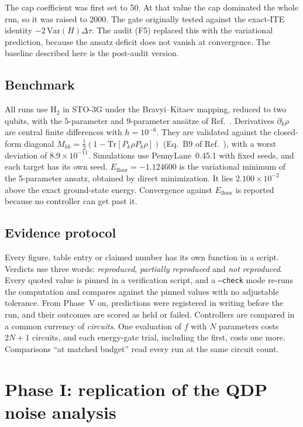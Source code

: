 \documentclass[aps,pra,reprint,superscriptaddress,nofootinbib]{revtex4-2}
\newcommand{\dt}{\Delta\tau}
\newcommand{\Tr}{\mathrm{Tr}}
\newcommand{\Efloor}{E_{\mathrm{floor}}}
\newcommand{\verdict}[1]{\textsl{#1}}
\begin{document}
The cap coefficient was first set to 50. At that value the cap dominated the whole run, so it
was raised to 2000. The gate originally tested against the exact-ITE identity
$-2\,\mathrm{Var}(H)\dt$. The audit (F5) replaced this with the variational prediction,
because the ansatz deficit does not vanish at convergence. The baseline described here is the post-audit version.

\subsection{Benchmark}

All runs use H$_2$ in STO-3G under the Bravyi--Kitaev mapping, reduced to two qubits, with the
5-parameter and 9-parameter ansätze of Ref.~\cite{QDP2024}. Derivatives $\partial_k\rho$ are
central finite differences with $h=10^{-6}$. They are validated against the closed-form
diagonal $M_{kk}=\tfrac12(1-\Tr[P_k\rho P_k\rho])$ (Eq.~B9 of Ref.~\cite{QDP2024}), with a
worst deviation of $8.9\times10^{-11}$. Simulations use PennyLane~0.45.1 with fixed seeds, and
each target has its own seed. $\Efloor=-1.124600$ is the variational minimum of the 5-parameter
ansatz, obtained by direct minimization. It lies $2.100\times10^{-2}$ above the exact ground-state energy. 
Convergence against $\Efloor$ is reported because no controller can get past it.

\subsection{Evidence protocol}
\label{sec:protocol}

Every figure, table entry or claimed number has its own function in a script. Verdicts use
three words: \verdict{reproduced}, \verdict{partially reproduced} and
\verdict{not reproduced}. Every quoted value is pinned in a verification script, and a
\texttt{--check} mode re-runs the computation and compares against the pinned values with no
adjustable tolerance. From Phase~V on, predictions were registered in writing before the run,
and their outcomes are scored as held or failed. Controllers are compared in a common currency
of \emph{circuits}. One evaluation of $f$ with $N$ parameters costs $2N+1$ circuits, and each energy-gate trial, including the first, costs one more. Comparisons ``at matched budget'' read every run at the same
circuit count.

\section{Phase I: replication of the QDP noise analysis}
\label{sec:phase1}
\end{document}
